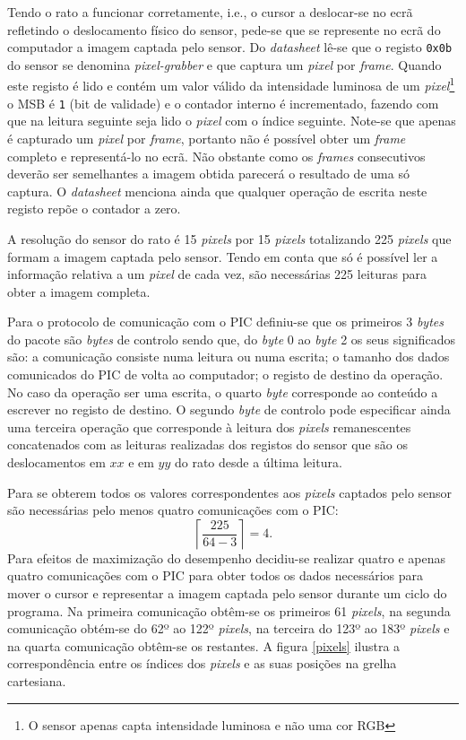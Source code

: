 \documentclass[a4paper,11pt]{article}
\begin{document}
Tendo o rato a funcionar corretamente, i.e., o cursor a deslocar-se no ecrã refletindo o deslocamento físico do sensor, pede-se que se represente no ecrã do computador a imagem captada pelo sensor. Do \emph{datasheet} lê-se que o registo \texttt{0x0b} do sensor se denomina \emph{pixel-grabber} e que captura um \emph{pixel} por \emph{frame}. Quando este registo é lido e contém um valor válido da intensidade luminosa de um \emph{pixel}\footnote{O sensor apenas capta intensidade luminosa e não uma cor RGB} o MSB é \texttt{1} (bit de validade) e o contador interno é incrementado, fazendo com que na leitura seguinte seja lido o \emph{pixel} com o índice seguinte. Note-se que apenas é capturado um \emph{pixel} por \emph{frame}, portanto não é possível obter um \emph{frame} completo e representá-lo no ecrã. Não obstante como os \emph{frames} consecutivos deverão ser semelhantes a imagem obtida parecerá o resultado de uma só captura. O \emph{datasheet} menciona ainda que qualquer operação de escrita neste registo repõe o contador a zero.

A resolução do sensor do rato é 15 \emph{pixels} por 15 \emph{pixels} totalizando 225 \emph{pixels} que formam a imagem captada pelo sensor. Tendo em conta que só é possível ler a informação relativa a um \emph{pixel} de cada vez, são necessárias 225 leituras para obter a imagem completa.

Para o protocolo de comunicação com o PIC definiu-se que os primeiros 3 \emph{bytes} do pacote são \emph{bytes} de controlo sendo que, do \emph{byte} 0 ao \emph{byte} 2 os seus significados são: a comunicação consiste numa leitura ou numa escrita; o tamanho dos dados comunicados do PIC de volta ao computador; o registo de destino da operação. No caso da operação ser uma escrita, o quarto \emph{byte} corresponde ao conteúdo a escrever no registo de destino. O segundo \emph{byte} de controlo pode especificar ainda uma terceira operação que corresponde à leitura dos \emph{pixels} remanescentes concatenados com as leituras realizadas dos registos do sensor que são os deslocamentos em $xx$ e em $yy$ do rato desde a última leitura.

Para se obterem todos os valores correspondentes aos \emph{pixels} captados pelo sensor são necessárias pelo menos quatro comunicações com o PIC: $$\left\lceil\frac{225}{64-3}\right\rceil=4.$$ Para efeitos de maximização do desempenho decidiu-se realizar quatro e apenas quatro comunicações com o PIC para obter todos os dados necessários para mover o cursor e representar a imagem captada pelo sensor durante um ciclo do programa. Na primeira comunicação obtêm-se os primeiros 61 \emph{pixels}, na segunda comunicação obtém-se do 62º ao 122º \emph{pixels}, na terceira do 123º ao 183º \emph{pixels} e na quarta comunicação obtêm-se os restantes. A figura \ref{pixels} ilustra a correspondência entre os índices dos \emph{pixels} e as suas posições na grelha cartesiana.
\end{document}
